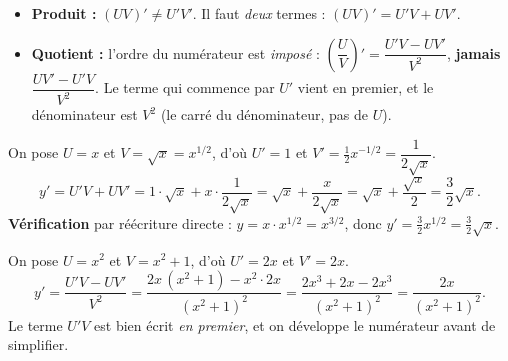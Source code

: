 \begin{piege}
\begin{itemize}[leftmargin=1.4em,itemsep=1pt]
\item \textbf{Produit :} $(UV)'\neq U'V'$. Il faut \emph{deux} termes : $(UV)'=U'V+UV'$.
\item \textbf{Quotient :} l'ordre du numérateur est \emph{imposé} : $\left(\dfrac{U}{V}\right)'=\dfrac{U'V-UV'}{V^{2}}$, \textbf{jamais} $\dfrac{UV'-U'V}{V^{2}}$. Le terme qui commence par $U'$ vient en premier, et le dénominateur est $V^{2}$ (le carré du dénominateur, pas de $U$).
\end{itemize}
\end{piege}

\begin{exemplebox}[un produit : $y=x\sqrt{x}$]
On pose $U=x$ et $V=\sqrt{x}=x^{1/2}$, d'où $U'=1$ et $V'=\tfrac12 x^{-1/2}=\dfrac{1}{2\sqrt{x}}$.
\[
y'=U'V+UV'=1\cdot\sqrt{x}+x\cdot\frac{1}{2\sqrt{x}}
=\sqrt{x}+\frac{x}{2\sqrt{x}}=\sqrt{x}+\frac{\sqrt{x}}{2}=\frac{3}{2}\sqrt{x}.
\]
\textbf{Vérification} par réécriture directe : $y=x\cdot x^{1/2}=x^{3/2}$, donc $y'=\tfrac32 x^{1/2}=\tfrac32\sqrt{x}$. \checkmark
\end{exemplebox}

\begin{exemplebox}[un quotient : $y=\dfrac{x^{2}}{x^{2}+1}$]
On pose $U=x^{2}$ et $V=x^{2}+1$, d'où $U'=2x$ et $V'=2x$.
\[
y'=\frac{U'V-UV'}{V^{2}}
=\frac{2x\,(x^{2}+1)-x^{2}\cdot 2x}{(x^{2}+1)^{2}}
=\frac{2x^{3}+2x-2x^{3}}{(x^{2}+1)^{2}}
=\frac{2x}{(x^{2}+1)^{2}}.
\]
Le terme $U'V$ est bien écrit \emph{en premier}, et on développe le numérateur avant de simplifier.
\end{exemplebox}


